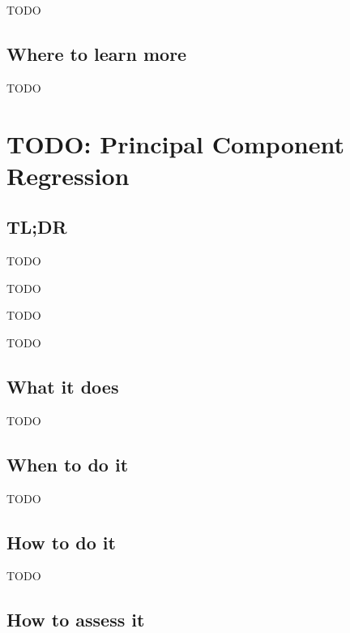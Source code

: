 \documentclass[
]{book}
\providecommand{\tightlist}{%
  \setlength{\itemsep}{0pt}\setlength{\parskip}{0pt}}
\begin{document}
TODO

\hypertarget{where-to-learn-more-14}{%
\section{Where to learn more}\label{where-to-learn-more-14}}

TODO

\hypertarget{principal-component-regression}{%
\chapter{TODO: Principal Component Regression}\label{principal-component-regression}}

\hypertarget{tldr-15}{%
\section{TL;DR}\label{tldr-15}}

\begin{description}
\tightlist
\item[What it does]
TODO
\item[When to do it]
TODO
\item[How to do it]
TODO
\item[How to assess it]
TODO
\end{description}

\hypertarget{what-it-does-15}{%
\section{What it does}\label{what-it-does-15}}

TODO

\hypertarget{when-to-do-it-15}{%
\section{When to do it}\label{when-to-do-it-15}}

TODO

\hypertarget{how-to-do-it-15}{%
\section{How to do it}\label{how-to-do-it-15}}

TODO

\hypertarget{how-to-assess-it-15}{%
\section{How to assess it}\label{how-to-assess-it-15}}
\end{document}
